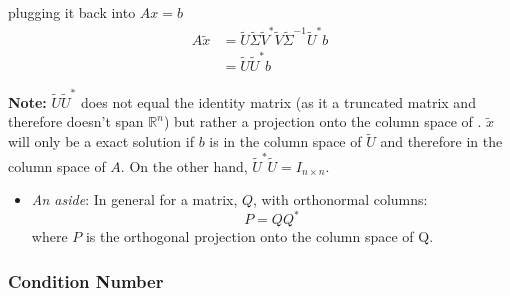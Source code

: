 \documentclass[11.5pt,a4paper]{article}
\begin{document}
\begin{itemize}
\begin{itemize}
        plugging it back into $Ax = b$
        \begin{align*}
            A\tilde{x} &= \tilde{U}\tilde{\Sigma}\tilde{V}^*\tilde{V}\tilde{\Sigma}^{-1}\tilde{U}^*b \\
            &= \tilde{U}\tilde{U}^*b
        \end{align*}

        \textbf{Note:} $\tilde{U}\tilde{U}^*$ does not equal the identity matrix (as it a truncated matrix and therefore doesn't span $\mathbb{R}^n$) but rather a projection onto the column space of . $\tilde{x}$ will only be a exact solution if $b$ is in the column space of $\tilde{U}$ and therefore in the column space of $A$. On the other hand, $\tilde{U}^*\tilde{U} = I_{n\times n}$.
        \begin{itemize}
            \item \textit{An aside}: In general for a matrix, $Q$, with orthonormal columns:
            \begin{equation*}
                P = QQ^*
            \end{equation*}
            where $P$ is the orthogonal projection onto the column space of Q.
        \end{itemize}
    \end{itemize}
    
\end{itemize}

\subsubsection*{Condition Number}
\end{document}
